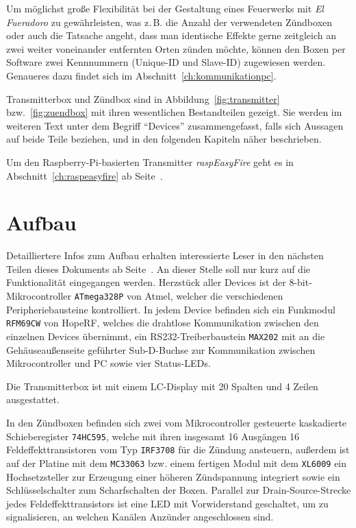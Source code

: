 \documentclass[paper=a4, parskip, numbers=noenddot, toc=listof, headsepline]{scrbook}
\newcommand{\anlage}{\emph{El Fueradoro}}
\begin{document}
		Um möglichst große Flexibilität bei der Gestaltung eines Feuerwerks mit {\anlage} zu gewährleisten, was z.\,B. die Anzahl der verwendeten Zündboxen oder auch die Tatsache angeht, dass man identische Effekte gerne zeitgleich an zwei weiter voneinander entfernten Orten zünden möchte, können den Boxen per Software zwei Kennnummern (Unique-ID und Slave-ID) zugewiesen werden. Genaueres dazu findet sich im Abschnitt~\ref{ch:kommunikationpc}.

		Transmitterbox und Zündbox sind in Abbildung~\ref{fig:transmitter} bzw.~\ref{fig:zuendbox} mit ihren wesentlichen Bestandteilen gezeigt. Sie werden im weiteren Text unter dem Begriff \enquote{Devices} zusammengefasst, falls sich Aussagen auf beide Teile beziehen, und in den folgenden Kapiteln näher beschrieben.
		
		Um den Raspberry-Pi-basierten Transmitter \emph{raspEasyFire} geht es in Abschnitt~\ref{ch:raspeasyfire} ab Seite~\pageref{ch:raspeasyfire}.

		\section{Aufbau}

			Detailliertere Infos zum Aufbau erhalten interessierte Leser in den nächsten Teilen dieses Dokuments ab Seite~\pageref{part:dokumentation}. An dieser Stelle soll nur kurz auf die Funktionalität eingegangen werden. Herzstück aller Devices ist der 8-bit-Mikrocontroller \texttt{ATmega328P} von Atmel, welcher die verschiedenen Peripheriebausteine kontrolliert. In jedem Device befinden sich ein Funkmodul \texttt{RFM69CW} von HopeRF, welches die drahtlose Kommunikation zwischen den einzelnen Devices übernimmt, ein RS232-Treiberbaustein \texttt{MAX202} mit an die Gehäuseaußenseite geführter Sub-D-Buchse zur Kommunikation zwischen Mikrocontroller und PC sowie vier Status-LEDs.

			Die Transmitterbox ist mit einem LC-Display mit 20 Spalten und 4 Zeilen ausgestattet.

			In den Zündboxen befinden sich zwei vom Mikrocontroller gesteuerte kaskadierte Schieberegister \texttt{74HC595}, welche mit ihren insgesamt 16 Ausgängen 16 Feldeffekttransistoren vom Typ \texttt{IRF3708} für die Zündung ansteuern, außerdem ist auf der Platine mit dem \texttt{MC33063} bzw. einem fertigen Modul mit dem \texttt{XL6009} ein Hochsetzsteller zur Erzeugung einer höheren Zündspannung integriert sowie ein Schlüsselschalter zum Scharfschalten der Boxen. Parallel zur Drain-Source-Strecke jedes Feldeffekttransistors ist eine LED mit Vorwiderstand geschaltet, um zu signalisieren, an welchen Kanälen Anzünder angeschlossen sind.
\end{document}
